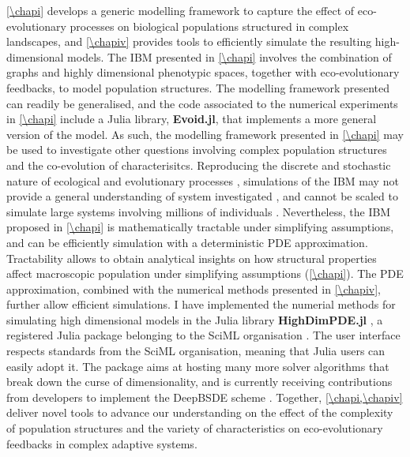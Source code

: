 \cref{\chapi} develops a generic modelling framework to capture the effect of eco-evolutionary processes on biological populations structured in complex landscapes, and \cref{\chapiv} provides tools to efficiently simulate the resulting high-dimensional models.
% 
The IBM presented in \cref{\chapi} involves the combination of graphs and highly dimensional phenotypic spaces, together with eco-evolutionary feedbacks, to model population structures. The modelling framework presented can readily be generalised, and the code associated to the numerical experiments in \cref{\chapi} include a Julia library, \textbf{Evoid.jl}, that implements a more general version of the model. %
% 
As such, the modelling framework presented in \cref{\chapi} may be used to investigate other questions involving complex population structures and the co-evolution of characterisitcs.
% 
Reproducing the discrete and stochastic nature of ecological and evolutionary processes \citep{Champagnat2006}, simulations of the IBM may not provide a general understanding of system investigated \xxx, and cannot be scaled to simulate large systems involving millions of individuals \xxx. Nevertheless, the IBM proposed in \cref{\chapi} is mathematically tractable under simplifying assumptions, and can be efficiently simulation with a deterministic PDE approximation.
% 
Tractability allows to obtain analytical insights on how structural properties affect macroscopic population under simplifying assumptions (\cref{\chapi}).
% 
The PDE approximation, combined with the numerical methods presented in \cref{\chapiv}, further allow efficient simulations. 
% 
I have implemented the numerial methods for simulating high dimensional models in the Julia library \textbf{HighDimPDE.jl} \citep{HighDimPDE}, a registered Julia package belonging to the SciML organisation \citep{XXX}.
The user interface respects standards from the SciML organisation, meaning that Julia users can easily adopt it.
%
The package aims at hosting many more solver algorithms that break down the curse of dimensionality, and is currently receiving contributions from developers to implement the DeepBSDE scheme \citep{Han2018}.
% 
% 
Together, \cref{\chapi,\chapiv} deliver novel tools to advance our understanding on the effect of the complexity of population structures and the variety of characteristics on eco-evolutionary feedbacks in complex adaptive systems.


